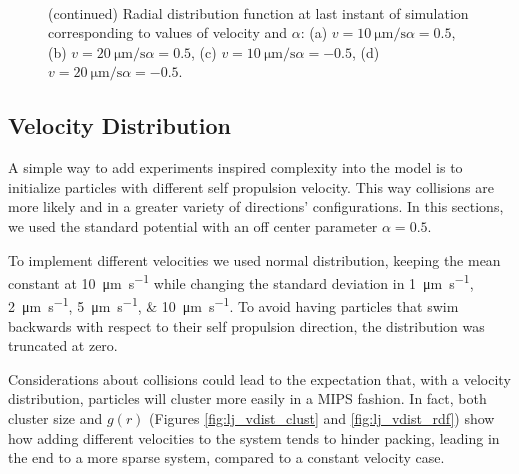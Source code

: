 \documentclass[../../master_thesis_np.tex]{subfiles}
\begin{document}
		\begin{figure}
			\centering
			\ContinuedFloat
			\\
			
			\caption{(continued) Radial distribution function at last instant of simulation corresponding to values of velocity and $\alpha$: (a) $v = \SI{10}{\um \per \second} \alpha = 0.5$, (b) $v = \SI{20}{\um \per \second} \alpha = 0.5$, (c) $v = \SI{10}{\um \per \second} \alpha = -0.5$, (d) $v = \SI{20}{\um \per \second} \alpha = -0.5$.}
			\label{fig:lj_velocity_rdf}
		\end{figure}

		\subsection{Velocity Distribution}
		\label{veldist}
		A simple way to add experiments inspired complexity into the model is to initialize particles with different self propulsion velocity. 
		This way collisions are more likely and in a greater variety of directions' configurations.
		In this sections, we used the standard potential with an off center parameter $\alpha = 0.5$.
		
		To implement different velocities we used normal distribution, keeping the mean constant at \SI{10}{\um \per \second} while changing the standard deviation in \qtylist{1; 2; 5; 10}{\um \per \second}.
		To avoid having particles that swim backwards with respect to their self propulsion direction, the distribution was truncated at zero.
		
		Considerations about collisions could lead to the expectation that, with a velocity distribution, particles will cluster more easily in a MIPS fashion.
		In fact, both cluster size and $g(r)$ (Figures \ref{fig:lj_vdist_clust} and \ref{fig:lj_vdist_rdf}) show how adding different velocities to the system tends to hinder packing, leading in the end to a more sparse system, compared to a constant velocity case.
		
\end{document}
